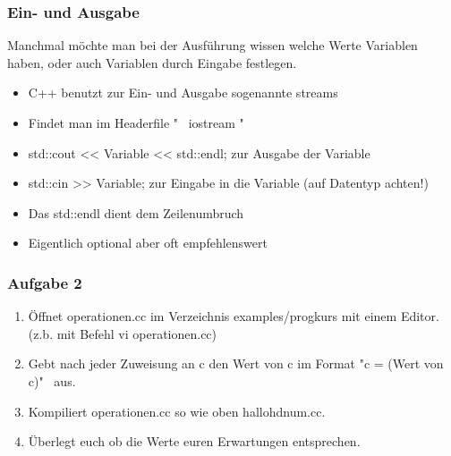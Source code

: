 \begin{frame}[fragile]
\frametitle{Ein- und Ausgabe}
Manchmal möchte man bei der Ausführung wissen welche Werte Variablen haben,
oder auch Variablen durch Eingabe festlegen.
\\
\begin{itemize}
\item C++ benutzt zur Ein- und Ausgabe sogenannte streams
\item Findet man im Headerfile " \ iostream "
\item std::cout << Variable << std::endl;  zur Ausgabe der Variable
\item std::cin >> Variable; zur Eingabe in die Variable (auf Datentyp achten!)
\item Das std::endl dient dem Zeilenumbruch
\item Eigentlich optional aber oft empfehlenswert
\end{itemize}
\end{frame}


\begin{frame}[fragile]
\frametitle{Aufgabe 2}
\begin{enumerate}
\item Öffnet operationen.cc im Verzeichnis examples/progkurs mit einem Editor. (z.b. mit Befehl vi operationen.cc)
\item Gebt nach jeder Zuweisung an c den Wert von c im Format "c = (Wert von c)" \ aus.
\item Kompiliert operationen.cc so wie oben hallohdnum.cc.
\item Überlegt euch ob die Werte euren Erwartungen entsprechen.
\end{enumerate}
\end{frame}

